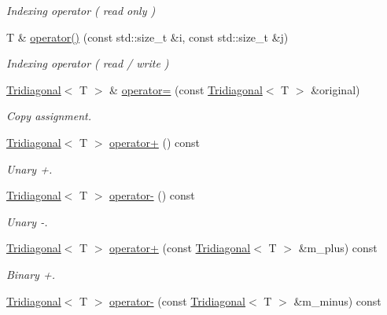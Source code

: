 \begin{DoxyCompactItemize}
\begin{DoxyCompactList}\small\item\em Indexing operator ( read only ) \end{DoxyCompactList}\item 
T \& \hyperlink{classLuna_1_1Tridiagonal_ae5bbfe810d68ead053a4178d742c58ea}{operator()} (const std\+::size\+\_\+t \&i, const std\+::size\+\_\+t \&j)
\begin{DoxyCompactList}\small\item\em Indexing operator ( read / write ) \end{DoxyCompactList}\item 
\hyperlink{classLuna_1_1Tridiagonal}{Tridiagonal}$<$ T $>$ \& \hyperlink{classLuna_1_1Tridiagonal_a0118c1de81c85bd371d166390a4e5d4b}{operator=} (const \hyperlink{classLuna_1_1Tridiagonal}{Tridiagonal}$<$ T $>$ \&original)
\begin{DoxyCompactList}\small\item\em Copy assignment. \end{DoxyCompactList}\item 
\hyperlink{classLuna_1_1Tridiagonal}{Tridiagonal}$<$ T $>$ \hyperlink{classLuna_1_1Tridiagonal_a654145a044a7fda0de429ece11915781}{operator+} () const
\begin{DoxyCompactList}\small\item\em Unary +. \end{DoxyCompactList}\item 
\hyperlink{classLuna_1_1Tridiagonal}{Tridiagonal}$<$ T $>$ \hyperlink{classLuna_1_1Tridiagonal_a7f92f3637e30a2fcc12fa959e00eefa0}{operator-\/} () const
\begin{DoxyCompactList}\small\item\em Unary -\/. \end{DoxyCompactList}\item 
\hyperlink{classLuna_1_1Tridiagonal}{Tridiagonal}$<$ T $>$ \hyperlink{classLuna_1_1Tridiagonal_a8e28947c6514a84755620ee96400c9cb}{operator+} (const \hyperlink{classLuna_1_1Tridiagonal}{Tridiagonal}$<$ T $>$ \&m\+\_\+plus) const
\begin{DoxyCompactList}\small\item\em Binary +. \end{DoxyCompactList}\item 
\hyperlink{classLuna_1_1Tridiagonal}{Tridiagonal}$<$ T $>$ \hyperlink{classLuna_1_1Tridiagonal_ada353bc1778051728e37403d71f57a34}{operator-\/} (const \hyperlink{classLuna_1_1Tridiagonal}{Tridiagonal}$<$ T $>$ \&m\+\_\+minus) const

\end{DoxyCompactItemize}
